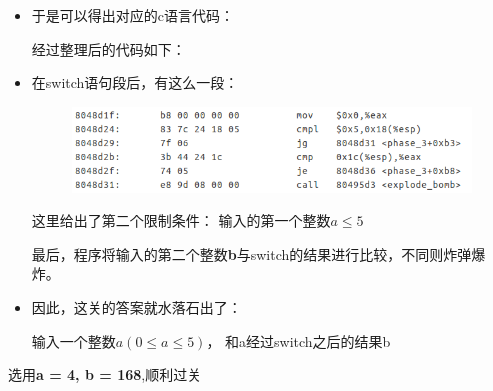\begin{itemize}
	\item
	于是可以得出对应的c语言代码：
	
	

	经过整理后的代码如下：
	
	
	
	\item
	在switch语句段后，有这么一段：
	
	\begin{figure}[h]
		\centering
			\includegraphics[scale=0.77]{images/phase_3_part_5.png}
	\end{figure}
	
	这里给出了第二个限制条件： 输入的第一个整数$a \le 5$
	
	最后，程序将输入的第二个整数\textbf{b}与switch的结果进行比较，不同则炸弹爆炸。
	
	\item
	因此，这关的答案就水落石出了：
		\begin{center}
			输入一个整数$a(0 \le a \le 5)$， 和a经过switch之后的结果b
		\end{center}
	\end{itemize}		
	选用\textbf{a = 4, b = 168},顺利过关
